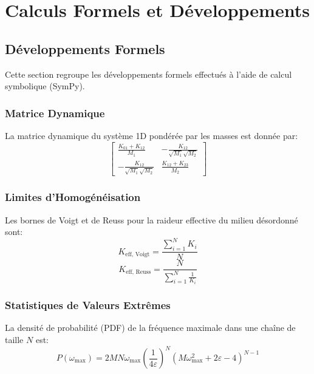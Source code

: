 \chapter{Calculs Formels et Développements}\label{annexe:A}

\section{Développements Formels}\label{annexe:math}
Cette section regroupe les développements formels effectués à l'aide de calcul symbolique (SymPy).

\subsection{Matrice Dynamique}
La matrice dynamique du système 1D pondérée par les masses est donnée par:
\label{eq:dynamical-matrix}
\begin{equation}
    \left[
    \begin{matrix}
        \frac{K_{01} + K_{12}}{M_{1}} & - \frac{K_{12}}{\sqrt{M_{1}} \sqrt{M_{2}}} \\
        - \frac{K_{12}}{\sqrt{M_{1}} \sqrt{M_{2}}} & \frac{K_{12} + K_{23}}{M_{2}}
    \end{matrix}
    \right]
\end{equation}

\subsection{Limites d'Homogénéisation}
Les bornes de Voigt et de Reuss pour la raideur effective du milieu désordonné sont:
\label{eq:voigt-bound}
\begin{equation}
    K_{\text{eff, Voigt}} = \frac{\sum_{i=1}^{N} K_{i}}{N}
\end{equation}
\label{eq:reuss-bound}
\begin{equation}
    K_{\text{eff, Reuss}} = \frac{N}{\sum_{i=1}^{N} \frac{1}{K_{i}}}
\end{equation}

\subsection{Statistiques de Valeurs Extrêmes}
La densité de probabilité (PDF) de la fréquence maximale dans une chaîne de taille $N$ est:
\label{eq:evs-pdf}
\begin{equation}
    P(\omega_{\max}) = 2 M N \omega_{\max} {\left(\frac{1}{4 \varepsilon}\right)}^{N} {\left(M \omega_{\max}^{2} + 2\varepsilon - 4\right)}^{N - 1}
\end{equation}


